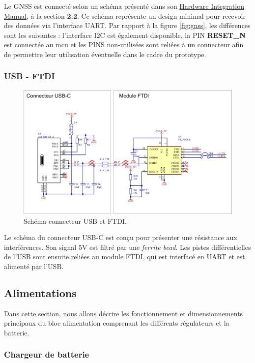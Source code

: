 Le \gls{GNSS} est connecté selon un schéma présenté dans son \href{https://www.u-blox.com/sites/default/files/CAM-M8-FW3_HIM_%28UBX-15030063%29.pdf}{Hardware Integration Manual}, à la section \textbf{2.2}. Ce schéma représente un design minimal pour recevoir des données via l'interface UART. Par rapport à la figure \ref{fig:gnss}, les différences sont les suivantes : l'interface I2C est également disponible, la PIN \textbf{RESET\_N} est connectée au \gls{mcu} et les PINS non-utilisées sont reliées à un connecteur afin de permettre leur utilisation éventuelle dans le cadre du prototype.

\subsubsection{USB - FTDI}

\begin{figure}[h]
	\centering
	\includegraphics[width=.8\linewidth]{../figures/etude/sch/USB-FTDI}
	\caption{Schéma connecteur USB et FTDI.}
	\label{fig:usb-ftdi}
\end{figure}

Le schéma du connecteur USB-C est conçu pour présenter une résistance aux interférences. Son signal 5V est filtré par une \textit{ferrite bead}. Les pistes différentielles de l'USB sont ensuite reliées au module \gls{FTDI}, qui est interfacé en UART et est alimenté par l'USB.

\clearpage

\subsection{Alimentations} \label{ssec:Dev-Alim}
Dans cette section, nous allons décrire les fonctionnement et dimensionnements principaux du bloc alimentation comprenant les différents régulateurs et la batterie.

\subsubsection{Chargeur de batterie} \label{sssec:Chargeur-bat}

